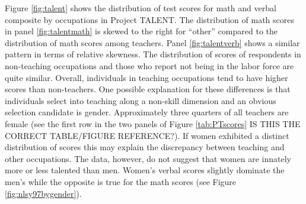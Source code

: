 \documentclass[onehalfspacing,11pt]{article}
\begin{document}
Figure \ref{fig:talent} shows the distribution of test scores for math and verbal composite by occupations in Project TALENT. The distribution of math scores in panel \ref{fig:talentmath} is skewed to the right for ``other'' compared to the distribution of math scores among teachers. Panel \ref{fig:talentverb} shows a similar pattern in terms of relative skewness. The distribution of scores of respondents in non-teaching occupations and those who report not being in the labor force are quite similar. Overall, individuals in teaching occupations tend to have higher scores than non-teachers. One possible explanation for these differences is that individuals select into teaching along a non-skill dimension and an obvious selection candidate is gender. Approximately three quarters of all teachers are female (see the first row in the two panels of Figure \ref{tab:PTscores} IS THIS THE CORRECT TABLE/FIGURE REFERENCE?). If women exhibited a distinct distribution of scores this may explain the discrepancy between teaching and other occupations. The data, however, do not suggest that women are innately more or less talented than men. Women's verbal scores slightly dominate the men's while the opposite is true for the math scores (see Figure \ref{fig:nlsy97bygender}).
\end{document}
